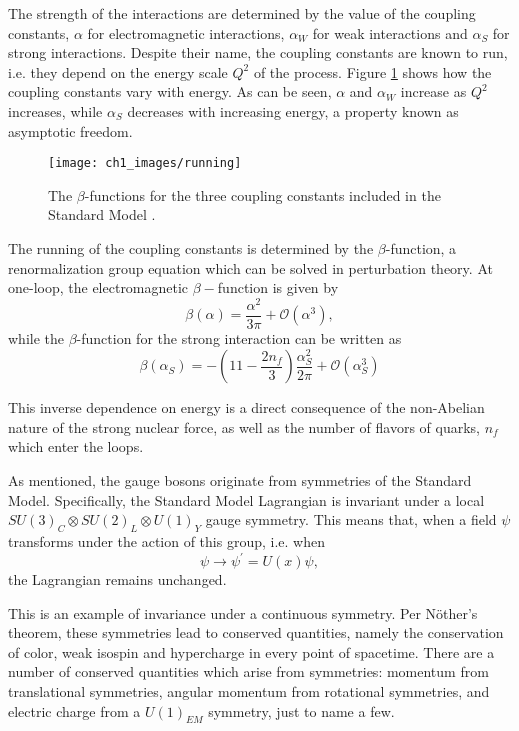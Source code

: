 \documentclass[10pt,a4paper]{book}
\begin{document}
The strength of the interactions are determined by the value of the coupling constants, $\alpha$ for electromagnetic interactions, $\alpha_W$ for weak interactions and $\alpha_S$ for strong interactions. Despite their name, the coupling constants are known to run, i.e. they depend on the energy scale $Q^2$ of the process. Figure \ref{running coupling constants} shows how the coupling constants vary with energy. As can be seen, $\alpha$ and $\alpha_W$ increase as $Q^2$ increases, while $\alpha_S$ decreases with increasing energy, a property known as asymptotic freedom. 

\begin{figure}
\centering
\texttt{[image: ch1\_images/running]}
\caption{The $\beta$-functions for the three coupling constants included in the Standard Model \cite{wiki:xxx}.}
\label{running coupling constants}
\end{figure}

The running of the coupling constants is determined by the $\beta$-function, a renormalization group equation which can be solved in perturbation theory. At one-loop, the electromagnetic $\beta-$function is given by \cite{pinkbook}
\begin{equation}
\beta(\alpha) = \frac{\alpha^2}{3\pi} + \mathcal{O}(\alpha^3),
\end{equation}
while the $\beta$-function for the strong interaction can be written as
\begin{equation}
\beta(\alpha_S) = -\left(11 - \frac{2n_f}{3} \right)\frac{\alpha_S^2}{2\pi} + \mathcal{O}(\alpha_S^3)
\end{equation}

This inverse dependence on energy is a direct consequence of the non-Abelian nature of the strong nuclear force, as well as the number of flavors of quarks, $n_f$ which enter the loops.  

As mentioned, the gauge bosons originate from symmetries of the Standard Model. Specifically, the Standard Model Lagrangian is invariant under a local $SU(3)_C \otimes SU(2)_L \otimes U(1)_Y$ gauge symmetry. This means that, when a field $\psi$ transforms under the action of this group, i.e. when
\begin{equation}
\psi \rightarrow \psi^\prime = U(x)\psi,
\end{equation}
the Lagrangian remains unchanged. 

This is an example of invariance under a continuous symmetry. Per N\"{o}ther's theorem, these symmetries lead to conserved quantities, namely the conservation of color, weak isospin and hypercharge in every point of spacetime. There are a number of conserved quantities which arise from symmetries: momentum from translational symmetries, angular momentum from rotational symmetries, and electric charge from a $U(1)_{EM}$ symmetry, just to name a few.
\end{document}
